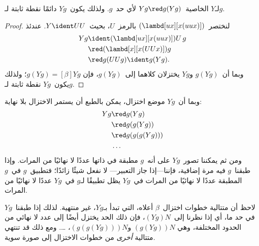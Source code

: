 \documentclass[../../../include/open-logic-section]{subfiles}
\begin{document}
\begin{thm}
  لـ$Y$ الخاصية~$Yg \red g(Yg)$ لأي حد~$g$. ولذلك يكون~$Yg$ دائمًا
  نقطة ثابتة لـ$g$.
\end{thm}

\begin{proof}
  لنختصر~$(\lambd[ux][x(uux)])$ بالرمز~$U$، بحيث~$Y \ident UU$.
  عندئذ
  \begin{align*}
    Y g &\ident (\lambd[ux][x(uux)])U\,g \\
    &\red (\lambd[x][x(UUx)])g\\
    & \red g(UUg) \ident g(Yg).
  \end{align*}
  وبما أن~$g(Yg)$ و$Yg$ يختزلان كلاهما إلى~$g(Yg)$، فإن
  $g(Yg) \equal[\beta] Yg$؛ ولذلك يكون~$Yg$ نقطة ثابتة لـ$g$.
\end{proof}

وبما أن~$Yg$ موضع اختزال، يمكن بالطبع أن يستمر الاختزال بلا نهاية:
\begin{align*}
  Y g &\red g (Y g) \\
    &\red g (g (Y g)) \\
    &\red g(g (g (Y g)))\\
    &\ldots
\end{align*}
ومن ثم يمكننا تصور~$Yg$ على أنه~$g$ مطبقة في ذاتها عددًا لا نهائيًا
من المرات. وإذا طبقنا~$g$ فيه مرة إضافية، فإننا---إذا جاز التعبير---
لا نفعل شيئًا زائدًا؛ فتطبيق~$g$ في~$g$ المطبقة عددًا لا نهائيًا من
المرات في~$Yg$ يظل تطبيقًا لـ$g$ في~$Yg$ عددًا لا نهائيًا من المرات.

لاحظ أن متتالية خطوات اختزال~$\beta$ أعلاه، التي تبدأ بـ$Yg$، غير
منتهية. لذلك إذا طبقنا~$Yg$ في حد ما، أي إذا نظرنا إلى~$(Yg)N$، فإن
ذلك الحد يختزل أيضًا إلى عدد لا نهائي من الحدود المختلفة، وهي
$(g(Yg))N$ و$(g(g(Yg)))N$، \dots. ومع ذلك قد تنتهي متتالية
\emph{أخرى} من خطوات الاختزال إلى صورة سوية.
\end{document}
